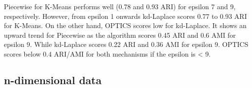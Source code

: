 \begin{figure}[H]
\begin{subfigure}{1\textwidth}
    \end{subfigure}
    \label{fig:validation-heart-dataset_comparison_3d-laplace}
\end{figure}

Piecewise for K-Means performs well (0.78 and 0.93 ARI) for epsilon 7 and 9, respectively.
However, from epsilon 1 onwards kd-Laplace scores 0.77 to 0.93 ARI for K-Means.
On the other hand, OPTICS scores low for kd-Laplace.
It shows an upward trend for Piecewise as the algorithm scores 0.45 ARI and 0.6 AMI for epsilon 9.
While kd-Laplace scores 0.22 ARI and 0.36 AMI for epsilon 9.
OPTICS scores below 0.4 ARI/AMI for both mechanisms if the epsilon is < 9.
\newpage
\subsection{n-dimensional data}
